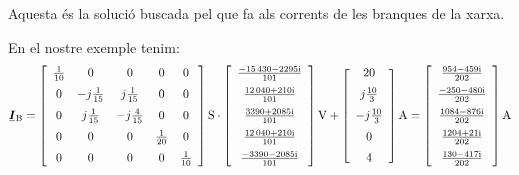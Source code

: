 \begin{list}{}
   Aquesta és la solució buscada pel que fa als corrents de les branques de la xarxa.

   En el nostre exemple tenim:
   \[
   \mcmplx{I}\ped{B} =
   \begin{bmatrix}\begin{array}{ccccc}
         \frac{1}{10} & 0 & 0 & 0 & 0 \\[2mm]
         0 & -j \frac{1}{15} & j \frac{1}{15} & 0 & 0 \\[2mm]
         0 & j \frac{1}{15} & -j \frac{4}{15} & 0 & 0 \\[2mm]
         0 & 0 & 0 & \frac{1}{20} & 0 \\[2mm]
         0 & 0 & 0 & 0 & \frac{1}{10}
   \end{array}\end{bmatrix}\unit{S} \cdot
   \begin{bmatrix}\begin{array}{c}
           \frac{\complexnum{ -15430 - j 2295}}{101} \\[2mm]
           \frac{\complexnum{12040 + j 210}}{101}  \\[2mm]
           \frac{\complexnum{3390 + j 2085}}{101} \\[2mm]
           \frac{\complexnum{ 12040 + j 210}}{101}  \\[2mm]
           \frac{\complexnum{ -3390 - j 2085}}{101}
     \end{array}\end{bmatrix}\unit{V}
   + \begin{bmatrix}\begin{array}{c}
         20 \\[2mm]
         j \frac{10}{3} \\[2mm]
         -j \frac{10}{3} \\[2mm]
         0 \\[2mm]
         4
     \end{array}\end{bmatrix}\unit{A} =
     \begin{bmatrix}\begin{array}{c}
      \frac{\complexnum{ 954 - j 459}}{202} \\[2mm]
      \frac{\complexnum{-250 - j 480}}{202}  \\[2mm]
      \frac{\complexnum{1084 - j 876}}{202} \\[2mm]
      \frac{\complexnum{1204 + j 21}}{202}  \\[2mm]
      \frac{\complexnum{130 - j 417}}{202}
    \end{array}\end{bmatrix}\unit{A}
   \]

\end{list}

